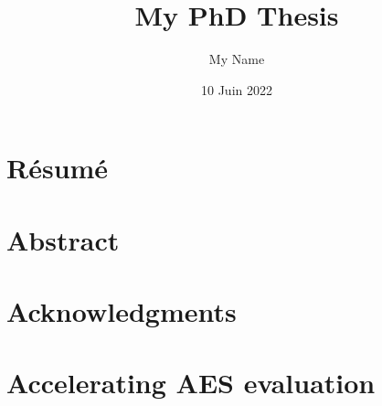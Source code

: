 \documentclass[11pt, twoside, openright]{thesis}
\title{My PhD Thesis}
\institute{l’École Normale Supérieure de Paris}
\author{My Name}
\date{10 Juin 2022}
\begin{document}
\frontmatter 
\hypersetup{pageanchor=false}
\maketitle
\hypersetup{pageanchor=true}
\dominitoc



\cleardoublepage
\chapter*{Résumé}
\thefrabstract{}
\vfill
\thefrkeywords{}
\cleardoublepage
\chapter*{Abstract}
\theenabstract{}
\vfill
\theenkeywords{}

\cleardoublepage
\chapter*{Acknowledgments}

\cleardoublepage
\hypertarget{contents}{}
\tableofcontents


\mainmatter





















\chapter{Accelerating AES evaluation}
\label{chap:hyppogriph}
\end{document}

